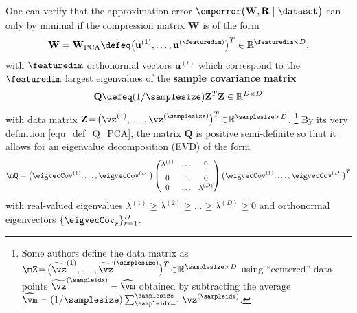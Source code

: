 \documentclass[12pt]{report}
\begin{document}
One can verify that the approximation error $\emperror \big( \mathbf{W},\mathbf{R} \mid \dataset\big)$ 
can only by minimal if the compression matrix $\mathbf{W}$ is of the form
\begin{equation}
\label{equ_def_PCA_W}
\mathbf{W} = \mathbf{W}_{\rm PCA} \defeq \big( \mathbf{u}^{(1)},\ldots, \mathbf{u}^{(\featuredim)} \big)^{T} \in \mathbb{R}^{\featuredim \times D}, 
\end{equation} 
with $\featuredim$ orthonormal vectors $\mathbf{u}^{(l)}$ which correspond to the 
$\featuredim$ largest eigenvalues of the {\bf sample covariance matrix} 
\begin{equation} 
\label{equ_def_Q_PCA}
\mathbf{Q} \defeq (1/\samplesize) \mathbf{Z}^{T} \mathbf{Z} \in \mathbb{R}^{D \times D} 
\end{equation}
with data matrix $\mathbf{Z}\!=\!\big( \vz^{(1)}, \ldots, \vz^{(\samplesize)} \big)^{T}\!\in\!\mathbb{R}^{\samplesize \times D}$.
\footnote{Some authors define the data matrix as $\mZ\!=\!\big( \widetilde{\vz}^{(1)}, \ldots, \widetilde{\vz}^{(\samplesize)} \big)^{T}\!\in\!\mathbb{R}^{\samplesize \times D}$  using ``centered'' data points $\widetilde{\vz}^{(\sampleidx)} - \widehat{\vm}$ 
	obtained by subtracting the average $\widehat{\vm} = (1/\samplesize) \sum_{\sampleidx=1}^{\samplesize} \vz^{(\sampleidx)}$.}
By its very definition \eqref{equ_def_Q_PCA}, the matrix $\mathbf{Q}$ is positive semi-definite so that it allows 
for an eigenvalue decomposition (EVD) of the form \cite{Strang2007}
\vspace*{-2mm}
\begin{equation}
\label{equ_EVD_Q_PCA}
 \mQ=\big(\eigvecCov^{(1)},\ldots,\eigvecCov^{(D)}\big)  \begin{pmatrix}\lambda^{(1)} &  \ldots & 0 \\ 0 & \ddots & 0  \\ 0 & \ldots & \lambda^{(D)} 
 \end{pmatrix} \big(\eigvecCov^{(1)},\ldots,\eigvecCov^{(D)}\big)^{T} \nonumber
\end{equation} 
with real-valued eigenvalues $\lambda^{(1)} \geq \lambda^{(2)}\geq \ldots \geq \lambda^{(D)} \geq 0$ and orthonormal 
eigenvectors $\{ \eigvecCov_{r} \}_{r=1}^{D}$. 
\end{document}
